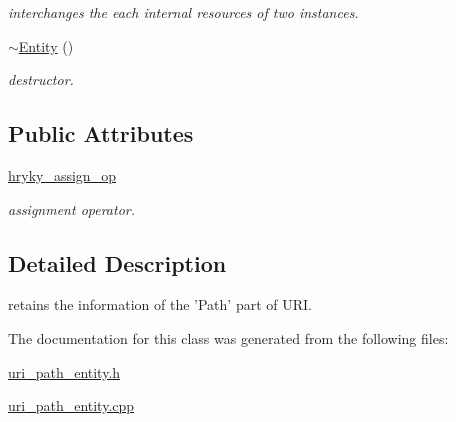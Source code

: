 \begin{DoxyCompactItemize}
\begin{DoxyCompactList}\small\item\em interchanges the each internal resources of two instances. \end{DoxyCompactList}\item 
\hypertarget{classhryky_1_1uri_1_1path_1_1_entity_a4a1d4b120ee293d1b28196cdf3ddb820}{\hyperlink{classhryky_1_1uri_1_1path_1_1_entity_a4a1d4b120ee293d1b28196cdf3ddb820}{$\sim$\-Entity} ()}\label{classhryky_1_1uri_1_1path_1_1_entity_a4a1d4b120ee293d1b28196cdf3ddb820}

\begin{DoxyCompactList}\small\item\em destructor. \end{DoxyCompactList}\end{DoxyCompactItemize}
\subsection*{Public Attributes}
\begin{DoxyCompactItemize}
\item 
\hypertarget{classhryky_1_1uri_1_1path_1_1_entity_ad44a8f8d3e019b01ccc7130cd7acd008}{\hyperlink{classhryky_1_1uri_1_1path_1_1_entity_ad44a8f8d3e019b01ccc7130cd7acd008}{hryky\-\_\-assign\-\_\-op}}\label{classhryky_1_1uri_1_1path_1_1_entity_ad44a8f8d3e019b01ccc7130cd7acd008}

\begin{DoxyCompactList}\small\item\em assignment operator. \end{DoxyCompactList}\end{DoxyCompactItemize}


\subsection{Detailed Description}
retains the information of the 'Path' part of U\-R\-I. 

The documentation for this class was generated from the following files\-:\begin{DoxyCompactItemize}
\item 
\hyperlink{uri__path__entity_8h}{uri\-\_\-path\-\_\-entity.\-h}\item 
\hyperlink{uri__path__entity_8cpp}{uri\-\_\-path\-\_\-entity.\-cpp}\end{DoxyCompactItemize}
